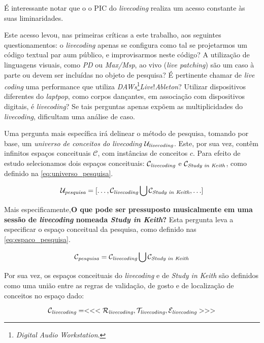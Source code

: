 É interessante notar que o o PIC do  \emph{livecoding} realiza um acesso constante às suas liminaridades.

Este acesso levou, nas primeiras críticas a este trabalho, aos seguintes questionamentos: o \emph{livecoding} apenas se configura como tal se projetarmos um código textual par aum público, e improvisarmos neste código? A utilização de linguagens visuais, como \emph{PD} ou \emph{Max/Msp}, ao vivo (\emph{live patching}) são um caso à parte ou devem ser incluídas no objeto de pesquisa? É pertinente chamar de \emph{live coding} uma performance que utiliza \emph{DAWs}\footnote{\emph{Digital Audio Workstation}.}\emph{Live}!\emph{Ableton}? Utilizar dispositivos diferentes do \emph{laptpop}, como corpos dançantes, em associação com dispositivos digitais, é \emph{livecoding}? Se tais perguntas apenas expõem as multiplicidades do \emph{livecoding}, dificultam uma análise de caso. 

Uma pergunta mais específica irá delinear o método de pesquisa, tomando por base, um \emph{universo de conceitos do livecoding} $\mathcal{U}_\emph{livecoding}$. Este, por sua vez, contêm infinitos espaços conceituais $\mathcal{C}$, com instâncias de conceitos $c$. Para efeito de estudo selecionamos dois espaços conceituais: $\mathcal{C}_\emph{livecoding}$ e $\mathcal{C}_\emph{Study in Keith}$, como definido na \autoref{eq:universo_pesquisa}.

\begin{equation}
\mathcal{U}_\emph{pesquisa} = [\ldots, \mathcal{C}_\emph{livecoding} \bigcup \mathcal{C}_\emph{Study in Keith}, \ldots]
\end{equation}\label{eq:universo_pesquisa}

Mais especificamente,\textbf{O que pode ser pressuposto musicalmente em uma sessão de \emph{livecoding} nomeada \emph{Study in Keith}?} Esta pergunta leva a especificar o espaço conceitual da pesquisa, como definido nas \autoref{eq:espaco_pesquisa}.

\begin{equation}
\mathcal{C}_\emph{pesquisa} = \mathcal{C}_\emph{livecoding} \bigcup \mathcal{C}_\emph{Study in Keith}
\end{equation}\label{eq:espaco_pesquisa}

Por sua vez, os espaços conceituais do \emph{livecoding} e de \emph{Study in Keith} são definidos como uma união entre as regras de validação, de gosto e de localização de conceitos no espaço dado:

\begin{equation}
\mathcal{C}_\emph{livecoding} = <<<\mathcal{R}_\emph{livecoding}, \mathcal{T}_\emph{livecoding}, \mathcal{E}_\emph{livecoding}>>>
\end{equation}\label{eq:livecoding}

